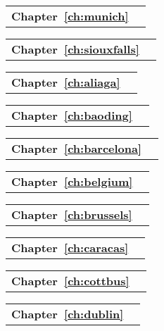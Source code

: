 \begin{tabular}[width=0.48\textwidth]{@{}l l}
\textbf{Chapter~\ref{ch:munich}} &  \\
\end{tabular}

\begin{tabular}[width=0.48\textwidth]{@{}l l}
\textbf{Chapter~\ref{ch:siouxfalls}} &  \\
\end{tabular}

\begin{tabular}[width=0.48\textwidth]{@{}l l}
\textbf{Chapter~\ref{ch:aliaga}} &  \\
\end{tabular}

\begin{tabular}[width=0.48\textwidth]{@{}l l}
\textbf{Chapter~\ref{ch:baoding}} &  \\
\end{tabular}

\begin{tabular}[width=0.48\textwidth]{@{}l l}
\textbf{Chapter~\ref{ch:barcelona}} &  \\
\end{tabular}

\begin{tabular}[width=0.48\textwidth]{@{}l l}
\textbf{Chapter~\ref{ch:belgium}} &  \\
\end{tabular}

\begin{tabular}[width=0.48\textwidth]{@{}l l}
\textbf{Chapter~\ref{ch:brussels}} &  \\
\end{tabular}

\begin{tabular}[width=0.48\textwidth]{@{}l l}
\textbf{Chapter~\ref{ch:caracas}} &  \\
\end{tabular}

\begin{tabular}[width=0.48\textwidth]{@{}l l}
\textbf{Chapter~\ref{ch:cottbus}} &  \\
\end{tabular}

\begin{tabular}[width=0.48\textwidth]{@{}l l}
\textbf{Chapter~\ref{ch:dublin}} &  \\
\end{tabular}

